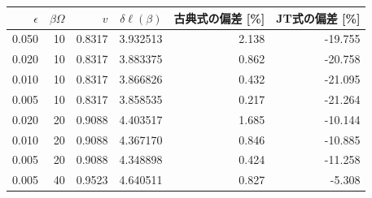 \begin{tabular}{rrrrrr}\toprule
$\epsilon$ & $\beta\Omega$ & $v$ & $\delta\ell(\beta)$ & 古典式の偏差 [\%] & JT式の偏差 [\%]\\\midrule
0.050 & 10 & 0.8317 & 3.932513 & 2.138 & -19.755 \\
0.020 & 10 & 0.8317 & 3.883375 & 0.862 & -20.758 \\
0.010 & 10 & 0.8317 & 3.866826 & 0.432 & -21.095 \\
0.005 & 10 & 0.8317 & 3.858535 & 0.217 & -21.264 \\
0.020 & 20 & 0.9088 & 4.403517 & 1.685 & -10.144 \\
0.010 & 20 & 0.9088 & 4.367170 & 0.846 & -10.885 \\
0.005 & 20 & 0.9088 & 4.348898 & 0.424 & -11.258 \\
0.005 & 40 & 0.9523 & 4.640511 & 0.827 & -5.308 \\
\bottomrule\end{tabular}
